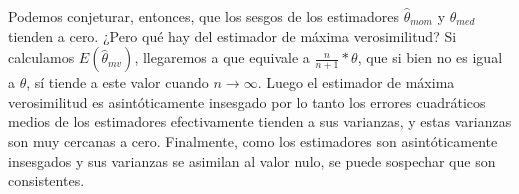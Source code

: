 Podemos conjeturar, entonces, que los sesgos de los estimadores $\hat{\theta}_{mom}$ y $\hat{\theta}_{med}$ tienden a cero. ¿Pero qué hay del estimador de máxima verosimilitud? Si calculamos $E(\hat{\theta}_{mv})$, llegaremos a que equivale a $\frac{n}{n+1} * \theta$, que si bien no es igual a $\theta$, sí tiende a este valor cuando $n \rightarrow \infty$. Luego el estimador de máxima verosimilitud es asintóticamente insesgado por lo tanto los errores cuadráticos medios de los estimadores efectivamente tienden a sus varianzas, y estas varianzas son muy cercanas a cero. Finalmente, como los estimadores son asintóticamente insesgados y sus varianzas se asimilan al valor nulo, se puede sospechar que son consistentes.

